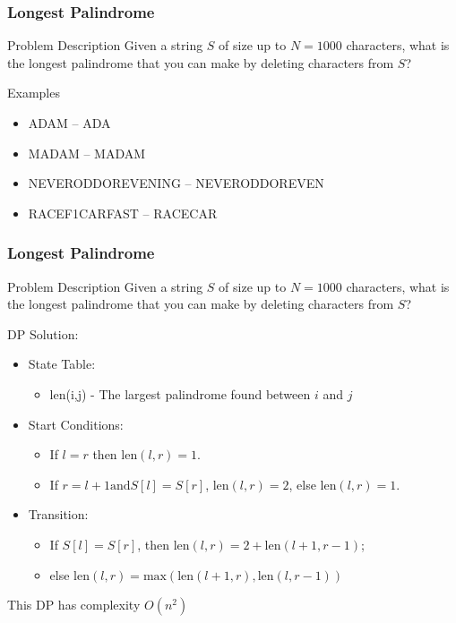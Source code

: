 \begin{frame}
  \frametitle{Longest Palindrome}
  {\smaller
    \begin{block}{Problem Description}
      Given a string $S$ of size up to $N = 1000$ characters, what is the
      longest palindrome that you can make by deleting characters from $S$?
    \end{block}

    Examples
    \begin{itemize}
    \item ADA\alert{M} -- ADA
    \item MADAM -- MADAM
    \item NEVERODDOREVEN\alert{ING} -- NEVERODDOREVEN
    \item RACE\alert{F1}CAR\alert{FAST} -- RACECAR
    \end{itemize}

  }
\end{frame}

\begin{frame}
  \frametitle{Longest Palindrome}
  {\smaller
    \begin{block}{Problem Description}
      Given a string $S$ of size up to $N = 1000$ characters, what is the
      longest palindrome that you can make by deleting characters from $S$?
    \end{block}

    DP Solution:
    \begin{itemize}
    \item State Table:
      {\smaller
      \begin{itemize}
      \item len(i,j) - The largest palindrome found between $i$ and $j$
      \end{itemize}}
    \item Start Conditions:
      {\smaller
      \begin{itemize}
        \item If $l=r$ then len$(l,r)=1$.
        \item If $r=l+1 \text{and} S[l]=S[r]$, len$(l,r)=2$, else len$(l,r)=1$.
      \end{itemize}}
    \item Transition:
      {\smaller
      \begin{itemize}
        \item If $S[l]=S[r]$, then len$(l,r)=2+\text{len}(l+1,r-1)$;
        \item else $\text{len}(l,r) = \text{max}(\text{len}(l+1,r),\text{len}(l,r-1))$
      \end{itemize}}
    \end{itemize}

    This DP has complexity $O(n^2)$

  }
\end{frame}

